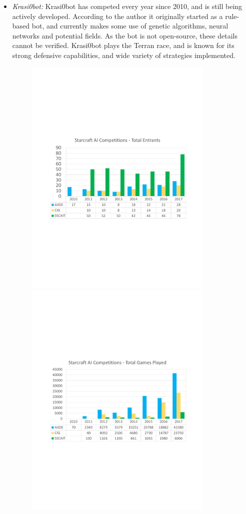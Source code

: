 \begin{itemize}
  \item {\em Krasi0bot:} Krasi0bot has competed every year since 2010, and is still being actively developed. According to the author it originally started as a rule-based bot, and currently makes some use of genetic algorithms, neural networks and potential fields. As the bot is not open-source, these details cannot be verified. Krasi0bot plays the Terran race, and is known for its strong defensive capabilities, and wide variety of strategies implemented. 
  \begin{figure}[t]
  \begin{center}
  \includegraphics[width=9cm]{fig/Entrants}
	\includegraphics[width=9cm]{fig/GamesPlayed}

\end{center}
\end{figure}
\end{itemize}
